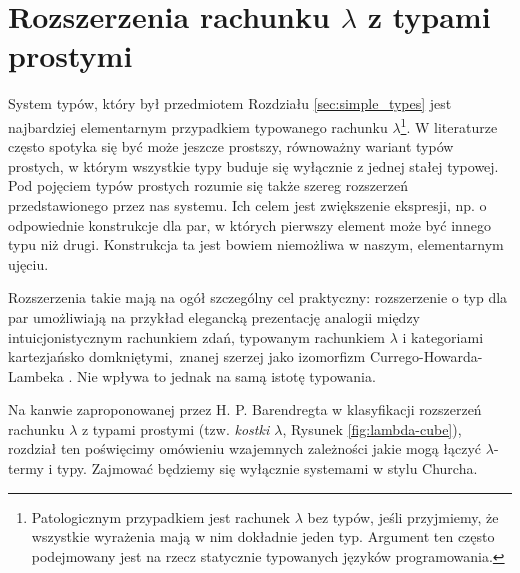 \section{Rozszerzenia rachunku \(\lambda\) z typami prostymi}

System typów, który był przedmiotem Rozdziału \ref{sec:simple_types} jest najbardziej elementarnym przypadkiem typowanego rachunku \(\lambda\)\footnote{Patologicznym przypadkiem jest rachunek \(\lambda\) bez typów, jeśli przyjmiemy, że wszystkie wyrażenia mają w nim dokładnie jeden typ. Argument ten często podejmowany jest na rzecz statycznie typowanych języków programowania.}. W literaturze często spotyka się być może jeszcze prostszy, równoważny wariant typów prostych, w którym wszystkie typy buduje się wyłącznie z jednej stałej typowej. Pod pojęciem typów prostych rozumie się także szereg rozszerzeń przedstawionego przez nas systemu. Ich celem jest zwiększenie ekspresji, np. o odpowiednie konstrukcje dla par, w których pierwszy element może być innego typu niż drugi. Konstrukcja ta jest bowiem niemożliwa w naszym, elementarnym ujęciu.

Rozszerzenia takie mają na ogół szczególny cel praktyczny: rozszerzenie o typ dla par umożliwiają na przykład elegancką prezentację analogii między intuicjonistycznym rachunkiem zdań, typowanym rachunkiem \(\lambda\) i kategoriami kartezjańsko domkniętymi, znanej szerzej jako izomorfizm Currego-Howarda-Lambeka \cite[Rozdział 3.1]{Girard:1989:PT:64805}. Nie wpływa to jednak na samą istotę typowania.  

Na kanwie zaproponowanej przez H. P. Barendregta w \cite[Rozdział 5]{Barendregt_1992} klasyfikacji rozszerzeń rachunku \(\lambda\) z typami prostymi (tzw. \emph{kostki \(\lambda\)}, Rysunek \ref{fig:lambda-cube}), rozdział ten poświęcimy omówieniu wzajemnych zależności jakie mogą łączyć \(\lambda\)-termy i typy. Zajmować będziemy się wyłącznie systemami w stylu Churcha.

